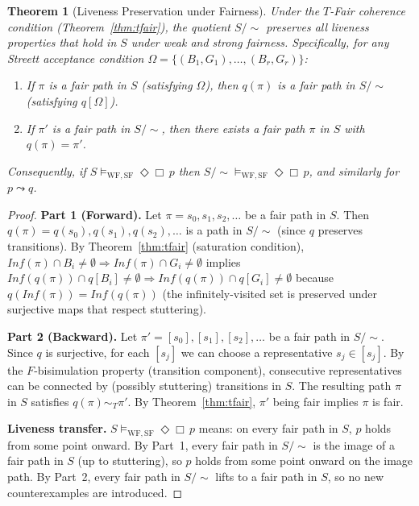\documentclass[11pt]{article}
\newtheorem{theorem}{Theorem}
\newcommand{\WF}{\ensuremath{\mathrm{WF}}}
\newcommand{\SF}{\ensuremath{\mathrm{SF}}}
\newcommand{\TFair}{$T$-Fair}
\begin{document}
\begin{theorem}[Liveness Preservation under Fairness]
\label{thm:liveness}
Under the \TFair{} coherence condition (Theorem~\ref{thm:tfair}), the
quotient $S/{\sim}$ preserves all liveness properties that hold in $S$
under weak and strong fairness.
Specifically, for any Streett acceptance condition
$\Omega = \{(B_1, G_1), \ldots, (B_r, G_r)\}$:
\begin{enumerate}[nosep]
\item If $\pi$ is a fair path in $S$ (satisfying $\Omega$), then $q(\pi)$ is
  a fair path in $S/{\sim}$ (satisfying $q[\Omega]$).
\item If $\pi'$ is a fair path in $S/{\sim}$, then there exists a fair path
  $\pi$ in $S$ with $q(\pi) = \pi'$.
\end{enumerate}
Consequently, if $S \models_{\WF,\SF} \Diamond\Box\,p$ then
$S/{\sim} \models_{\WF,\SF} \Diamond\Box\,p$, and similarly for
$p \leadsto q$.
\end{theorem}

\begin{proof}
\textbf{Part 1 (Forward).}
Let $\pi = s_0, s_1, s_2, \ldots$ be a fair path in $S$.
Then $q(\pi) = q(s_0), q(s_1), q(s_2), \ldots$ is a path in $S/{\sim}$
(since $q$ preserves transitions).
By Theorem~\ref{thm:tfair} (saturation condition),
$\mathit{Inf}(\pi) \cap B_i \neq \emptyset \Rightarrow
\mathit{Inf}(\pi) \cap G_i \neq \emptyset$
implies
$\mathit{Inf}(q(\pi)) \cap q[B_i] \neq \emptyset \Rightarrow
\mathit{Inf}(q(\pi)) \cap q[G_i] \neq \emptyset$
because $q(\mathit{Inf}(\pi)) = \mathit{Inf}(q(\pi))$ (the infinitely-visited
set is preserved under surjective maps that respect stuttering).

\textbf{Part 2 (Backward).}
Let $\pi' = [s_0], [s_1], [s_2], \ldots$ be a fair path in $S/{\sim}$.
Since $q$ is surjective, for each $[s_j]$ we can choose a representative
$s_j \in [s_j]$.
By the $F$-bisimulation property (transition component), consecutive
representatives can be connected by (possibly stuttering) transitions in $S$.
The resulting path $\pi$ in $S$ satisfies $q(\pi) \sim_T \pi'$.
By Theorem~\ref{thm:tfair}, $\pi'$ being fair implies $\pi$ is fair.

\textbf{Liveness transfer.}
$S \models_{\WF,\SF} \Diamond\Box\,p$ means: on every fair path in $S$,
$p$ holds from some point onward.
By Part~1, every fair path in $S/{\sim}$ is the image of a fair path in $S$
(up to stuttering), so $p$ holds from some point onward on the image path.
By Part~2, every fair path in $S/{\sim}$ lifts to a fair path in $S$,
so no new counterexamples are introduced.
\end{proof}
\end{document}
